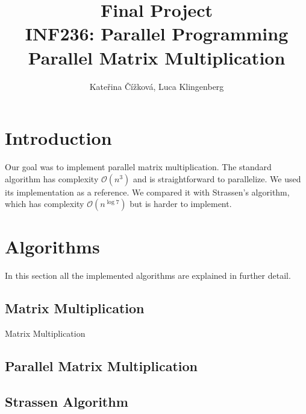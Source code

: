 \documentclass{article}
\title{Final Project\\ INF236: Parallel Programming\\ Parallel Matrix Multiplication}
\author{Kate\v{r}ina \v{C}\'{i}\v{z}kov\'{a}, Luca Klingenberg}
\begin{document}
\maketitle

\section{Introduction}
Our goal was to implement parallel matrix multiplication.
The standard algorithm has complexity $\mathcal{O}(n^3)$ and is straightforward
to parallelize. We used its implementation as a reference. We compared
it with Strassen’s algorithm, which has complexity $\mathcal{O}(n^{\log{}7})$
but is harder to implement.



\section{Algorithms}
In this section all the implemented algorithms are explained in further detail.

\subsection{Matrix Multiplication}



\begin{algorithm}[H] 
\caption{Matrix Multiplication}
\label{alg:matmul}
\begin{algorithmic}[1]
\Statex
{}
		\EndFor
			\EndFor
		\EndFor
	\EndFor
	\State {}
\EndFunction
\end{algorithmic}
\end{algorithm}

\subsection{Parallel Matrix Multiplication}
\subsection{Strassen Algorithm}
\end{document}
